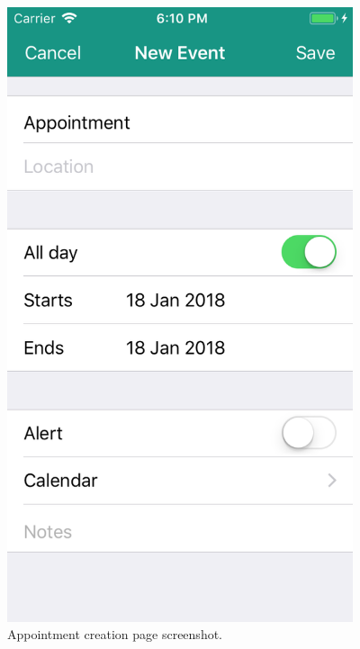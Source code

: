 \begin{figure}
	\centering
	\includegraphics[width=4in]{./screenshots/iOSappointment.png}
	\caption{Appointment creation page screenshot.}
	\label{fig:isoappointment}
\end{figure}


